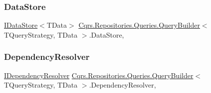 \subsubsection{\texorpdfstring{Data\+Store}{DataStore}}
{\footnotesize\ttfamily \hyperlink{interfaceCqrs_1_1DataStores_1_1IDataStore}{I\+Data\+Store}$<$T\+Data$>$ \hyperlink{classCqrs_1_1Repositories_1_1Queries_1_1QueryBuilder}{Cqrs.\+Repositories.\+Queries.\+Query\+Builder}$<$ T\+Query\+Strategy, T\+Data $>$.Data\+Store\hspace{0.3cm}{\ttfamily [get]}, {\ttfamily [protected]}}

\mbox{\label{classCqrs_1_1Repositories_1_1Queries_1_1QueryBuilder_aef22b10001de3e15a2817f8446a5b5f4_aef22b10001de3e15a2817f8446a5b5f4}} 
\subsubsection{\texorpdfstring{Dependency\+Resolver}{DependencyResolver}}
{\footnotesize\ttfamily \hyperlink{interfaceCqrs_1_1Configuration_1_1IDependencyResolver}{I\+Dependency\+Resolver} \hyperlink{classCqrs_1_1Repositories_1_1Queries_1_1QueryBuilder}{Cqrs.\+Repositories.\+Queries.\+Query\+Builder}$<$ T\+Query\+Strategy, T\+Data $>$.Dependency\+Resolver\hspace{0.3cm}{\ttfamily [get]}, {\ttfamily [protected]}}

